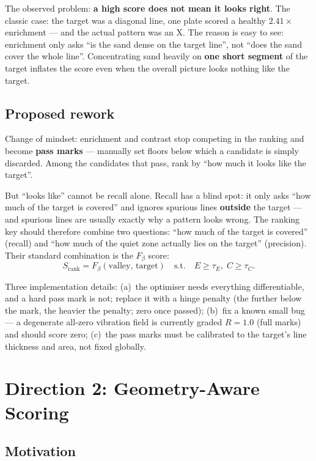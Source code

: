 \documentclass[11pt,a4paper]{article}
\begin{document}
The observed problem: \textbf{a high score does not mean it looks right}. The classic case: the target was a diagonal line, one plate scored a healthy $2.41\times$ enrichment --- and the actual pattern was an X. The reason is easy to see: enrichment only asks ``is the sand dense on the target line'', not ``does the sand cover the whole line''. Concentrating sand heavily on \textbf{one short segment} of the target inflates the score even when the overall picture looks nothing like the target.

\subsection{Proposed rework}

Change of mindset: enrichment and contrast stop competing in the ranking and become \textbf{pass marks} --- manually set floors below which a candidate is simply discarded. Among the candidates that pass, rank by ``how much it looks like the target''.

But ``looks like'' cannot be recall alone. Recall has a blind spot: it only asks ``how much of the target is covered'' and ignores spurious lines \textbf{outside} the target --- and spurious lines are usually exactly why a pattern looks wrong. The ranking key should therefore combine two questions: ``how much of the target is covered'' (recall) and ``how much of the quiet zone actually lies on the target'' (precision). Their standard combination is the $F_\beta$ score:
\begin{equation}
S_{\mathrm{rank}} = F_\beta(\mathrm{valley},\,\mathrm{target})
\quad\text{s.t.}\quad E \ge \tau_E,\; C \ge \tau_C .
\end{equation}

Three implementation details: (a)~the optimiser needs everything differentiable, and a hard pass mark is not; replace it with a hinge penalty (the further below the mark, the heavier the penalty; zero once passed); (b)~fix a known small bug --- a degenerate all-zero vibration field is currently graded $R=1.0$ (full marks) and should score zero; (c)~the pass marks must be calibrated to the target's line thickness and area, not fixed globally.

\section{Direction 2: Geometry-Aware Scoring}

\subsection{Motivation}
\end{document}
